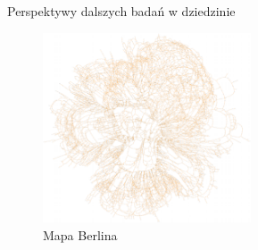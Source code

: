 \documentclass{beamer}
\begin{document}
\begin{frame}{Perspektywy dalszych badań w dziedzinie} 

\begin{figure}[h!]
\includegraphics[width=0.55\textwidth]{img/berlin2}
\caption{Mapa Berlina}
\end{figure}

\end{frame}
\end{document}
